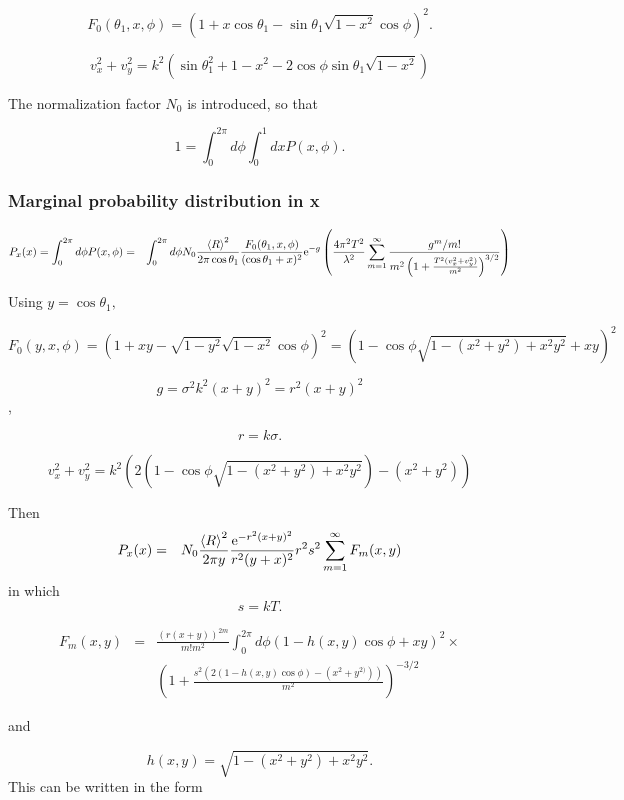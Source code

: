 \documentclass[11pt]{article}
\newcommand{\e}{{\rm e}}
\begin{document}
{{{{$$F_{0}(\theta_{1},x,\phi)=\left(1+x\cos\theta_{1}-\sin\theta_{1}\sqrt{1-x^{2}}\cos\phi\right)^{2}.$$

$$v_{x}^{2}+v_{y}^{2}=k^{2}\left(\sin\theta_{1}^{2}+1-x^{2}-2\cos\phi\sin\theta_{1}\sqrt{1-x^{2}}\right)$$

The normalization factor $N_{0}$ is introduced, so that

$$1=\int_{0}^{2\pi}d\phi\int_{0}^{1}dxP(x,\phi).$$

\subsubsection{Marginal probability distribution in x}
\begin{eqnarray}
P_{x}(x)=\int_{0}^{2\pi}d\phi P(x,\phi)&=&
\int_{0}^{2\pi}d\phi N_{0}\frac{\left<R\right>^{2}}{2\pi\cos\theta_{1}}\frac{F_{0}(\theta_{1},x,\phi)}{(\cos{\theta_{1}}+x)^{2}}
\e^{-g}\left(\frac{4\pi^{2}T^{2}}{\lambda^{2}}\sum_{m=1}^{\infty}\frac{g^{m}/m!}{m^{2}\left(1+\frac{T^{2}(v_{x}^{2}+v_{y}^{2})}{m^{2}}\right)^{3/2}}\right)
\end{eqnarray}

Using $y=\cos\theta_{1},$

$$F_{0}(y,x,\phi)=\left(1+xy-\sqrt{1-y^{2}}\sqrt{1-x^{2}}\cos\phi\right)^{2}=\left(1-\cos\phi\sqrt{1-(x^{2}+y^{2})+x^{2}y^{2}}+xy\right)^{2}$$

$$g=\sigma^{2}k^{2}(x+y)^{2}=r^{2}(x+y)^{2}$$,

$$r=k\sigma.$$

$$v_{x}^{2}+v_{y}^{2}=k^{2}\left(2\left(1-\cos\phi\sqrt{1-(x^{2}+y^{2})+x^{2}y^{2}}\right)-(x^{2}+y^{2})\right)$$

Then
\begin{eqnarray}
P_{x}(x)&=&N_{0}\frac{\left<R\right>^{2}}{2\pi y}\frac{\e^{-r^{2}(x+y)^{2}}}{r^{2}(y+x)^{2}}
r^{2}s^{2}
\sum_{m=1}^{\infty}F_{m}(x,y)
\end{eqnarray}
in which
$$s=kT.$$

\begin{eqnarray} F_{m}(x,y)&=&\frac{(r(x+y))^{2m}}{m!m^{2}}\int_{0}^{2\pi}d\phi\left(1-h(x,y)\cos\phi +xy\right)^{2}\times\\
&&\left(1+\frac{s^{2}\left(2(1-h(x,y)\cos\phi )-(x^{2}+y^{2)})\right)}{m^{2}}\right)^{-3/2}
\end{eqnarray}

and

$$h(x,y)=\sqrt{1-(x^{2}+y^{2})+x^{2}y^{2}}.$$
This can be written in the form

}}}}
\end{document}
